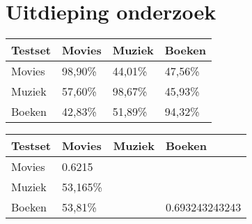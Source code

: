 \section{Uitdieping onderzoek}\label{Deel 2}



\begin{table}[h]
\begin{tabular}{llll}
\hline
Testset & Movies  & Muziek  & Boeken  \\  \hline
Movies  & 98,90\% & 44,01\% & 47,56\% \\  \hline
Muziek  & 57,60\% & 98,67\% & 45,93\% \\ \hline
Boeken  & 42,83\% & 51,89\% & 94,32\% \\ \hline
\end{tabular}
\end{table}

\begin{table}[h]
\begin{tabular}{llll}
\hline
Testset & Movies   & Muziek & Boeken         \\ \hline
Movies  & 0.6215   &        &                \\ \hline
Muziek  & 53,165\% &        &                \\ \hline
Boeken  & 53,81\%  &        & 0.693243243243 \\ \hline
\end{tabular}
\end{table}

